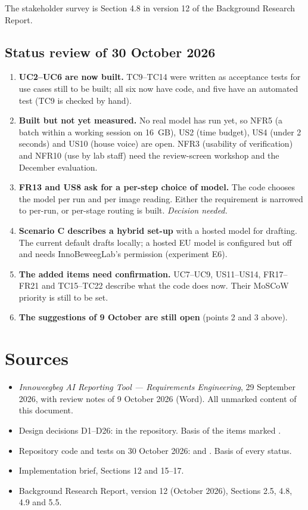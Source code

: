 The stakeholder survey is Section 4.8 in version 12 of the Background Research Report.

\subsection{Status review of 30 October 2026}

\begin{enumerate}
\item \textbf{UC2--UC6 are now built.} TC9--TC14 were written as acceptance tests for use cases still to be built; all six now have code, and five have an automated test (TC9 is checked by hand).
\item \textbf{Built but not yet measured.} No real model has run yet, so NFR5 (a batch within a working session on 16~GB), US2 (time budget), US4 (under 2 seconds) and US10 (house voice) are open. NFR3 (usability of verification) and NFR10 (use by lab staff) need the review-screen workshop and the December evaluation.
\item \textbf{FR13 and US8 ask for a per-step choice of model.} The code chooses the model per run and per image reading. Either the requirement is narrowed to per-run, or per-stage routing is built. \textit{Decision needed.}
\item \textbf{Scenario C describes a hybrid set-up} with a hosted model for drafting. The current default drafts locally; a hosted EU model is configured but off and needs InnoBeweegLab's permission (experiment E6).
\item \textbf{The added items need confirmation.} UC7--UC9, US11--US14, FR17--FR21 and TC15--TC22 describe what the code does now. Their MoSCoW priority is still to be set.
\item \textbf{The suggestions of 9 October are still open} (points 2 and 3 above).
\end{enumerate}

\section*{Sources}

\begin{itemize}
\item \textit{Innoweegbeg AI Reporting Tool --- Requirements Engineering}, 29 September 2026, with review notes of 9 October 2026 (Word). All unmarked content of this document.
\item Design decisions D1--D26:  in the repository. Basis of the items marked \added.
\item Repository code and tests on 30 October 2026:  and . Basis of every status.
\item Implementation brief, Sections 12 and 15--17.
\item Background Research Report, version 12 (October 2026), Sections 2.5, 4.8, 4.9 and 5.5.
\end{itemize}
